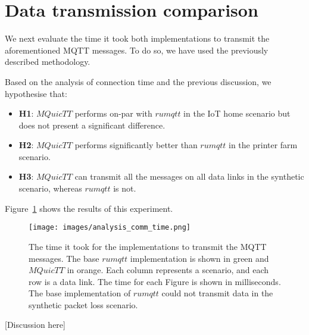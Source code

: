 \section{Data transmission comparison}

We next evaluate the time it took both implementations to transmit the aforementioned MQTT messages.
To do so, we have used the previously described methodology.

Based on the analysis of connection time and the previous discussion, we hypothesise that:

\begin{itemize}
    \item \textbf{H1}: $MQuicTT$ performs on-par with $rumqtt$ in the IoT home scenario but does not present a significant difference.
    \item \textbf{H2}: $MQuicTT$ performs significantly better than $rumqtt$ in the printer farm scenario.
    \item \textbf{H3}: $MQuicTT$ can transmit all the messages on all data links in the synthetic scenario, whereas $rumqtt$ is not.
\end{itemize}

Figure~\ref{fig:comm_time} shows the results of this experiment.

\begin{figure}[ht]
    \centering
    \texttt{[image: images/analysis\_comm\_time.png]}
    \caption{The time it took for the implementations to transmit the MQTT messages.
        The base $rumqtt$ implementation is shown in green and $MQuicTT$ in orange.
        Each column represents a scenario, and each row is a data link.
        The time for each Figure is shown in milliseconds. The base implementation of $rumqtt$ could not transmit data in the synthetic packet loss scenario.}
    \label{fig:comm_time}
\end{figure}

[Discussion here]
